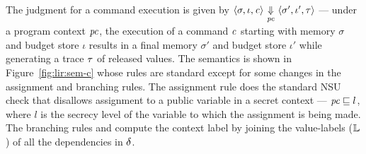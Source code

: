 The judgment for a command execution is given by $\langle \sigma,
\iota, \mathit{c} \rangle {~\underset{\mathit{pc}}{\Downarrow}~} \langle \sigma', \iota', \tau \rangle$ 
--- under a program context $\mathit{pc}$, the execution of a
command $\mathit{c}$ starting with memory $\sigma$ and budget store $\iota$
results in a final memory $\sigma'$ and budget store $\iota'$ while
generating a trace $\tau$ of released values. The semantics is shown in
Figure~\ref{fig:lir:sem-c} whose rules are standard except for some changes
in the assignment and branching rules. The assignment rule
 does the standard NSU check that disallows
assignment to a public variable in a secret context --- $\mathit{pc}
\sqsubseteq l$, where $l$ is the secrecy level of the variable
 to which the assignment is being made. 
The branching rules  and
 compute the context label by joining the
value-labels ($\mathbb{L}$) of all the dependencies in $\delta$. 
